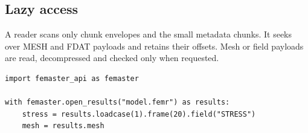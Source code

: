 \subsection{Lazy access}

A reader scans only chunk envelopes and the small metadata chunks. It seeks
over MESH and FDAT payloads and retains their offsets. Mesh or field payloads
are read, decompressed and checked only when requested.

\begin{verbatim}
import femaster_api as femaster

with femaster.open_results("model.femr") as results:
    stress = results.loadcase(1).frame(20).field("STRESS")
    mesh = results.mesh
\end{verbatim}
